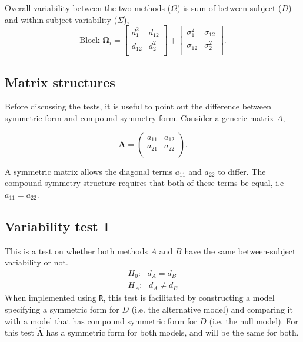 \documentclass[12pt, a4paper]{report}
\theoremstyle{plain}
\theoremstyle{definition}
\theoremstyle{remark}
\begin{document}
	Overall variability between the two methods ($\Omega$) is sum of between-subject ($D$) and within-subject variability ($\Sigma$),
	\[
	\mbox{Block } \boldsymbol{\Omega}_i = \left[ \begin{array}{cc} d^2_1 & d_{12}\\ d_{12} & d^2_2\\ \end{array} \right]
	+ \left[\begin{array}{cc} \sigma^2_1 & \sigma_{12}\\ \sigma_{12} & \sigma^2_2\\ \end{array}\right].
	\]
	
	
	\subsection{Matrix structures}
	Before discussing the tests, it is useful to point out the difference between symmetric form and compound symmetry form. Consider a generic matrix $A$,
	
	\begin{equation}
	\boldsymbol{A} = \left( \begin{array}{cc}
	a_{11} & a_{12}  \\
	a_{21} & a_{22}  \\
	\end{array}\right).
	\end{equation}
	
	A symmetric matrix allows the diagonal terms $a_{11}$ and $a_{22}$ to differ.
	The compound symmetry structure requires that both of these terms be equal, i.e $a_{11} = a_{22}$.
	
	\subsection{Variability test 1}
	This is a test on whether both methods $A$ and $B$ have the same between-subject variability or not.
	\begin{eqnarray}
	H_{0}: \mbox{ }d_{A}  = d_{B} \\
	H_{A}: \mbox{ }d_{A}  \neq d_{B}
	\end{eqnarray}
	When implemented using \texttt{R}, this test is facilitated by constructing a model specifying a symmetric form for $D$ (i.e. the alternative model) and comparing it with a model that has compound symmetric form for $D$ (i.e. the null model). For this test $\boldsymbol{\hat{\Lambda}}$ has a symmetric form for both models, and will be the same for both.
	
\end{document}
